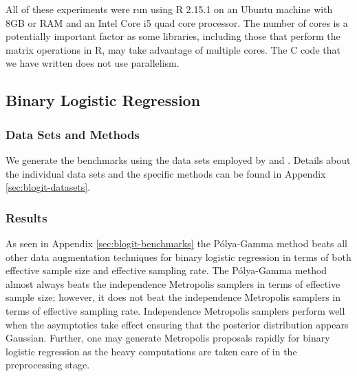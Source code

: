 \documentclass[11pt]{article}
\newcommand{\Polya}{P\'{o}lya}
\begin{document}
All of these experiments were run using R 2.15.1 on an Ubuntu machine with 8GB
or RAM and an Intel Core i5 quad core processor.  The number of cores is a
potentially important factor as some libraries, including those that perform the
matrix operations in R, may take advantage of multiple cores.  The C code that
we have written does not use parallelism.

\subsection{Binary Logistic Regression}

\subsubsection{Data Sets and Methods}

We generate the benchmarks using the data sets employed by
\cite{holmes-held-2006} and \cite{fruhwirth-schnatter-fruhwirth-2010}.  Details
about the individual data sets and the specific methods can be found in Appendix
\ref{sec:blogit-datasets}.

\subsubsection{Results}

As seen in Appendix \ref{sec:blogit-benchmarks} the \Polya-Gamma method beats
all other data augmentation techniques for binary logistic regression in terms
of both effective sample size and effective sampling rate.  The \Polya-Gamma
method almost always beats the independence Metropolis samplers in terms of
effective sample size; however, it does not beat the independence Metropolis
samplers in terms of effective sampling rate.  Independence Metropolis samplers
perform well when the asymptotics take effect ensuring that the posterior
distribution appears Gaussian.  Further, one may generate Metropolis proposals
rapidly for binary logistic regression as the heavy computations are taken care
of in the preprocessing stage.
\end{document}

